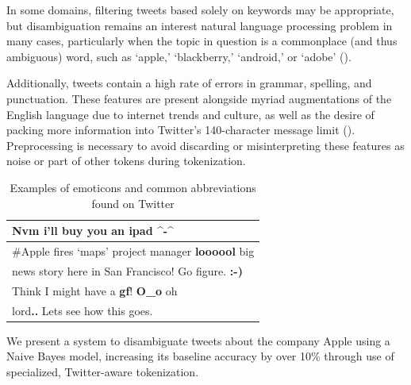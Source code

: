 \documentclass[letterpaper]{article}
\begin{document}
In some domains, filtering tweets based solely on keywords may be appropriate, but disambiguation remains an interest natural language processing problem in many cases, particularly when the topic in question is a commonplace (and thus ambiguous) word, such as `apple,' `blackberry,' `android,' or `adobe' (\citeauthor{journals/ijcsa/YervaMA12}). 

Additionally, tweets contain a high rate of errors in grammar, spelling, and punctuation. These features are present alongside myriad augmentations of the English language due to internet trends and culture, as well as the desire of packing more information into Twitter's 140-character message limit (\citeauthor{Laboreiro:2010:TMM:1871840.1871853}). Preprocessing is necessary to avoid discarding or misinterpreting these features as noise or part of other tokens during tokenization.

\begin{table}[ht]
\centering
\begin{tabular}{|l|}
	\hline
\textbf{Nvm} i'll buy you an ipad \textbf{\^{}-\^{}} \\ \hline
\#Apple fires `maps' project manager \textbf{loooool} big \\
 news story here in San Francisco! Go figure. \textbf{:-)} \\ \hline
Think I might have a \textbf{gf}! \textbf{O\_o} oh \\
lord\textbf{..} Lets see how this goes. \\ \hline
\end{tabular}
\caption{Examples of emoticons and common abbreviations found on Twitter}
\label{tab:emoticons}
\end{table}

We present a system to disambiguate tweets about the company Apple using a Naive Bayes model, increasing its baseline accuracy by over 10\% through use of specialized, Twitter-aware tokenization.
\end{document}
